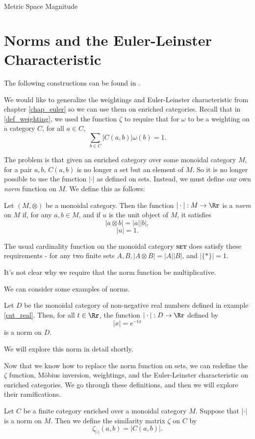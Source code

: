 \documentclass[12pt]{pom_thesis}
\newcommand{\catname}[1]{\textbf{\textsc{#1}}}
\begin{document}
\begin{chapter}{Metric Space Magnitude}
\section{Norms and the Euler-Leinster Characteristic}
The following constructions can be found in \cite{Lein4}.

We would like to generalize the weightings and Euler-Leinster characteristic from chapter \ref{chap_euler} so we can use them on enriched categories. Recall that in \ref{def_weighting}, we used the function $\zeta$ to require that for $\omega$ to be a weighting on a category $C$, for all $a \in C$,
\[
\sum_{b \in C}|C(a,b)|\omega(b) = 1.
\]

The problem is that given an enriched category over some monoidal category $M$, for a pair $a,b$, $C(a,b)$ is no longer a set but an element of $M$. So it is no longer possible to use the function $|\cdot|$ as defined on sets. Instead, we must define our own \emph{norm} function on $M$. We define this as follows:
\begin{defn}
Let $(M,\otimes)$ be a monoidal category. Then the function $| \cdot |: M \rightarrow \Rr$ is a \emph{norm} on $M$ if, for any $a,b\in M$, and if $u$ is the unit object of $M$, it satisfies
\[
|a \otimes b| = |a||b|,
\]
\[
|u| = 1.
\]
\end{defn}

The usual cardinality function on the monoidal category \catname{set} does satisfy these requirements - for any two finite sets $A,B, |A \otimes B| = |A||B|$, and $|\{*\}|=1$.

It's not clear why we require that the norm function be multiplicative. %

We can consider some examples of norms.
\begin{examp}
Let $D$ be the monoidal category of non-negative real numbers defined in example \ref{cat_real}. Then, for all $t \in \Rr$, the function $|\cdot|:D \rightarrow \Rr$ defined by 
\[
|x| = e^{-tx}
\]
is a norm on $D$.

We will explore this norm in detail shortly.
\end{examp}

Now that we know how to replace the norm function on sets, we can redefine the $\zeta$ function, M\"obius inversion, weightings, and the Euler-Leinster characteristic on enriched categories. We go through these definitions, and then we will explore their ramifications.
\begin{defn}
Let $C$ be a finite category enriched over a monoidal category $M$. Suppose that $|\cdot|$ is a norm on $M$. Then we define the similarity matrix $\zeta$ on $C$ by
\[
\zeta_{|\cdot|}(a,b) = |C(a,b)|.
\]
\end{defn}


\end{chapter}
\end{document}

